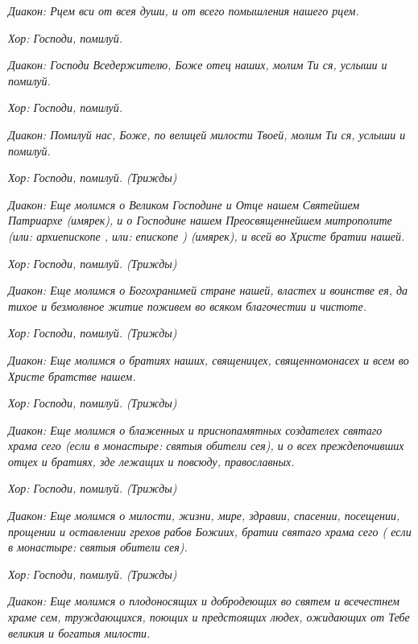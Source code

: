 \itshape Диакон:\normalfont{} Рцем вси от всея души, и от всего помышления нашего рцем.


\itshape Хор:\normalfont{} Господи, помилуй.


\itshape Диакон:\normalfont{} Господи Вседержителю, Боже отец наших, молим Ти ся, услыши и помилуй.


\itshape Хор:\normalfont{} Господи, помилуй.


\itshape Диакон:\normalfont{} Помилуй нас, Боже, по велицей милости Твоей, молим Ти ся, услыши и помилуй.


\itshape Хор:\normalfont{} Господи, помилуй. \itshape (Трижды)\normalfont{}


\itshape Диакон:\normalfont{} Еще молимся о Великом Господине и Отце нашем Святейшем Патриархе \itshape (имярек)\normalfont{}, и о Господине нашем Преосвященнейшем митрополите \itshape (или:\normalfont{} архиепископе \itshape , или:\normalfont{} епископе \itshape ) (имярек)\normalfont{}, и всей во Христе братии нашей.


\itshape Хор:\normalfont{} Господи, помилуй. \itshape (Трижды)\normalfont{}


\itshape Диакон:\normalfont{} Еще молимся о Богохранимей стране нашей, властех и воинстве ея, да тихое и безмолвное житие поживем во всяком благочестии и чистоте.


\itshape Хор:\normalfont{} Господи, помилуй. \itshape (Трижды)\normalfont{}


\itshape Диакон:\normalfont{} Еще молимся о братиях наших, священицех, священномонасех и всем во Христе братстве нашем.


\itshape Хор:\normalfont{} Господи, помилуй. \itshape (Трижды)\normalfont{}


\itshape Диакон:\normalfont{} Еще молимся о блаженных и приснопамятных создателех святаго храма сего \itshape (если в монастыре:\normalfont{} святыя обители сея), и о всех преждепочивших отцех и братиях, зде лежащих и повсюду, православных.


\itshape Хор:\normalfont{} Господи, помилуй. \itshape (Трижды)\normalfont{}


\itshape Диакон:\normalfont{} Еще молимся о милости, жизни, мире, здравии, спасении, посещении, прощении и оставлении грехов рабов Божиих, братии святаго храма сего ( \itshape если в монастыре:\normalfont{} святыя обители сея).


\itshape Хор:\normalfont{} Господи, помилуй. \itshape (Трижды)\normalfont{}


\itshape Диакон:\normalfont{} Еще молимся о плодоносящих и добродеющих во святем и всечестнем храме сем, труждающихся, поющих и предстоящих людех, ожидающих от Тебе великия и богатыя милости.


